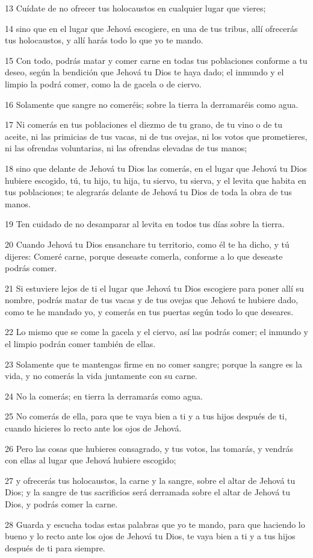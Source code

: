 \par 13 Cuídate de no ofrecer tus holocaustos en cualquier lugar que vieres;
\par 14 sino que en el lugar que Jehová escogiere, en una de tus tribus, allí ofrecerás tus holocaustos, y allí harás todo lo que yo te mando.
\par 15 Con todo, podrás matar y comer carne en todas tus poblaciones conforme a tu deseo, según la bendición que Jehová tu Dios te haya dado; el inmundo y el limpio la podrá comer, como la de gacela o de ciervo.
\par 16 Solamente que sangre no comeréis; sobre la tierra la derramaréis como agua.
\par 17 Ni comerás en tus poblaciones el diezmo de tu grano, de tu vino o de tu aceite, ni las primicias de tus vacas, ni de tus ovejas, ni los votos que prometieres, ni las ofrendas voluntarias, ni las ofrendas elevadas de tus manos;
\par 18 sino que delante de Jehová tu Dios las comerás, en el lugar que Jehová tu Dios hubiere escogido, tú, tu hijo, tu hija, tu siervo, tu sierva, y el levita que habita en tus poblaciones; te alegrarás delante de Jehová tu Dios de toda la obra de tus manos.
\par 19 Ten cuidado de no desamparar al levita en todos tus días sobre la tierra.
\par 20 Cuando Jehová tu Dios ensanchare tu territorio, como él te ha dicho, y tú dijeres: Comeré carne, porque deseaste comerla, conforme a lo que deseaste podrás comer.
\par 21 Si estuviere lejos de ti el lugar que Jehová tu Dios escogiere para poner allí su nombre, podrás matar de tus vacas y de tus ovejas que Jehová te hubiere dado, como te he mandado yo, y comerás en tus puertas según todo lo que deseares.
\par 22 Lo mismo que se come la gacela y el ciervo, así las podrás comer; el inmundo y el limpio podrán comer también de ellas.
\par 23 Solamente que te mantengas firme en no comer sangre; porque la sangre es la vida, y no comerás la vida juntamente con su carne.
\par 24 No la comerás; en tierra la derramarás como agua.
\par 25 No comerás de ella, para que te vaya bien a ti y a tus hijos después de ti, cuando hicieres lo recto ante los ojos de Jehová.
\par 26 Pero las cosas que hubieres consagrado, y tus votos, las tomarás, y vendrás con ellas al lugar que Jehová hubiere escogido;
\par 27 y ofrecerás tus holocaustos, la carne y la sangre, sobre el altar de Jehová tu Dios; y la sangre de tus sacrificios será derramada sobre el altar de Jehová tu Dios, y podrás comer la carne.
\par 28 Guarda y escucha todas estas palabras que yo te mando, para que haciendo lo bueno y lo recto ante los ojos de Jehová tu Dios, te vaya bien a ti y a tus hijos después de ti para siempre.

